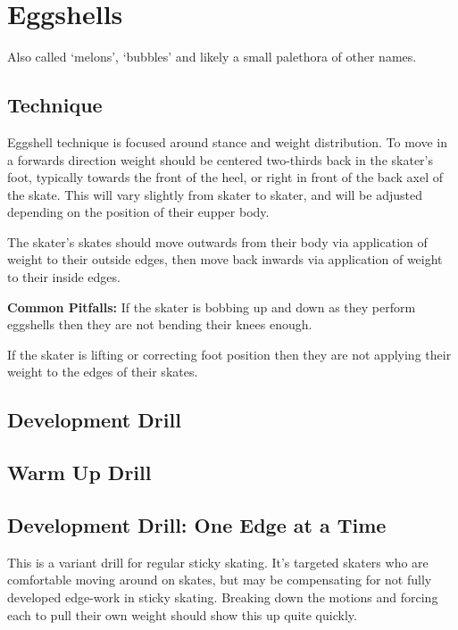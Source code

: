 \section{Eggshells}
\label{sec:sticky/eggshells}

Also called `melons', `bubbles' and likely a small palethora of other names. 


\subsection*{Technique}

Eggshell technique is focused around stance and weight distribution.
To move in a forwards direction weight should be centered two-thirds back in the skater's foot, typically towards the front of the heel, or right in front of the back axel of the skate.  
This will vary slightly from skater to skater, and will be adjusted depending on the position of their eupper body. 

The skater's skates should move outwards from their body via application of weight to their outside edges, then move back inwards via application of weight to their inside edges.


{\bf Common Pitfalls: }
If the skater is bobbing up and down as they perform eggshells then they are not bending their knees enough. 


If the skater is lifting or correcting foot position then they are not applying their weight to the edges of their skates.  

\subsection*{Development Drill}

\subsection*{Warm Up Drill}

\subsection*{Development Drill: One Edge at a Time}
\label{drill:sticky/eggshells/one_edge}

This is a variant drill for regular sticky skating. 
It's targeted skaters who are comfortable moving around on skates, but may be compensating for not fully developed edge-work in sticky skating.
Breaking down the motions and forcing each to pull their own weight should show this up quite quickly.

